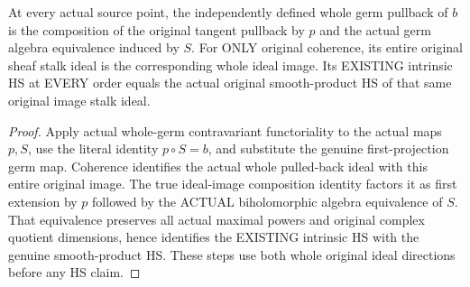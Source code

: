 \begin{theorem}
\label{hir:actual-block-projection-entire-stalk-factorization}
\leanok
At every actual source point, the independently defined whole germ pullback
of $b$ is the composition of the original tangent pullback by $p$ and the
actual germ algebra equivalence induced by $S$. For ONLY original
coherence, its entire original sheaf stalk ideal is the corresponding
whole ideal image. Its EXISTING intrinsic HS at EVERY order equals the
actual original smooth-product HS of that same original image stalk ideal.
\end{theorem}
\begin{proof}
Apply actual whole-germ contravariant functoriality to the actual maps
$p,S$, use the literal identity $p\circ S=b$, and substitute the genuine
first-projection germ map. Coherence identifies the actual whole pulled-back
ideal with this entire original image. The true ideal-image composition
identity factors it as first extension by $p$ followed by the ACTUAL
biholomorphic algebra equivalence of $S$. That equivalence preserves all
actual maximal powers and original complex quotient dimensions, hence
identifies the EXISTING intrinsic HS with the genuine smooth-product HS.
These steps use both whole original ideal directions before any HS claim.
\end{proof}

